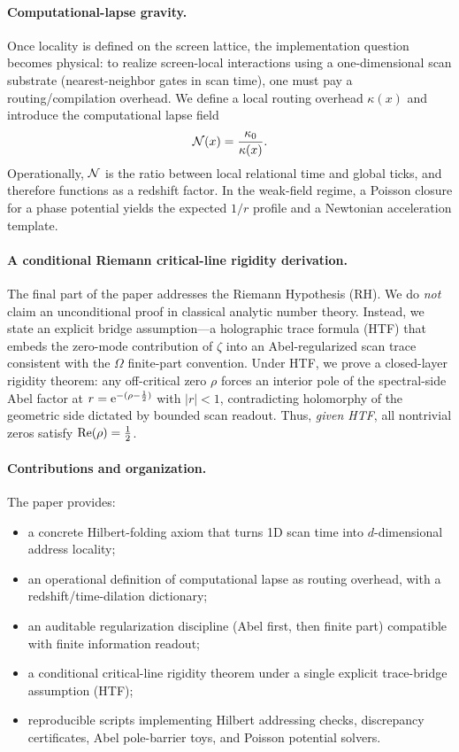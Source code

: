 \paragraph{Computational-lapse gravity.}
Once locality is defined on the screen lattice, the implementation question becomes physical:
to realize screen-local interactions using a one-dimensional scan substrate (nearest-neighbor gates in scan time), one must pay a routing/compilation overhead.
We define a local routing overhead $\kappa(x)$ and introduce the computational lapse field
\[
\mathcal{N}(x)=\frac{\kappa_0}{\kappa(x)}.
\]
Operationally, $\mathcal{N}$ is the ratio between local relational time and global ticks, and therefore functions as a redshift factor.
In the weak-field regime, a Poisson closure for a phase potential yields the expected $1/r$ profile and a Newtonian acceleration template.

\paragraph{A conditional Riemann critical-line rigidity derivation.}
The final part of the paper addresses the Riemann Hypothesis (RH).
We do \emph{not} claim an unconditional proof in classical analytic number theory.
Instead, we state an explicit bridge assumption---a holographic trace formula (HTF) that embeds the zero-mode contribution of $\zeta$ into an Abel-regularized scan trace consistent with the $\Omega$ finite-part convention.
Under HTF, we prove a closed-layer rigidity theorem:
any off-critical zero $\rho$ forces an interior pole of the spectral-side Abel factor at $r=\mathrm{e}^{-(\rho-\frac12)}$ with $|r|<1$, contradicting holomorphy of the geometric side dictated by bounded scan readout.
Thus, \emph{given HTF}, all nontrivial zeros satisfy $\operatorname{Re}(\rho)=\tfrac12$.

\paragraph{Contributions and organization.}
The paper provides:
\begin{itemize}
\item a concrete Hilbert-folding axiom that turns 1D scan time into $d$-dimensional address locality;
\item an operational definition of computational lapse as routing overhead, with a redshift/time-dilation dictionary;
\item an auditable regularization discipline (Abel first, then finite part) compatible with finite information readout;
\item a conditional critical-line rigidity theorem under a single explicit trace-bridge assumption (HTF);
\item reproducible scripts implementing Hilbert addressing checks, discrepancy certificates, Abel pole-barrier toys, and Poisson potential solvers.
\end{itemize}

